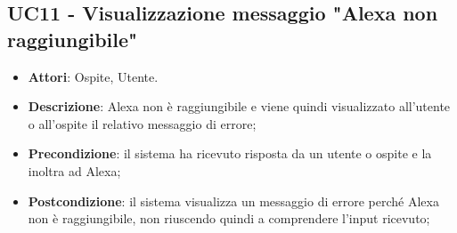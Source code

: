 \documentclass[../AnalisiDeiRequisiti.tex]{subfiles}
\begin{document}
\subsection{UC11 - Visualizzazione messaggio "Alexa non raggiungibile"} 
\label{sssec:UC11} 
\begin{itemize} 
\item \textbf{Attori}: Ospite, Utente.
\item \textbf{Descrizione}: Alexa non è raggiungibile e viene quindi visualizzato all'utente o all'ospite il relativo messaggio di errore;
\item \textbf{Precondizione}: il sistema ha ricevuto risposta da un utente o ospite e la inoltra ad Alexa;
\item \textbf{Postcondizione}: il sistema visualizza un messaggio di errore perché Alexa non è raggiungibile, non riuscendo quindi a comprendere l'input ricevuto;
\end{itemize} 
\end{document}
